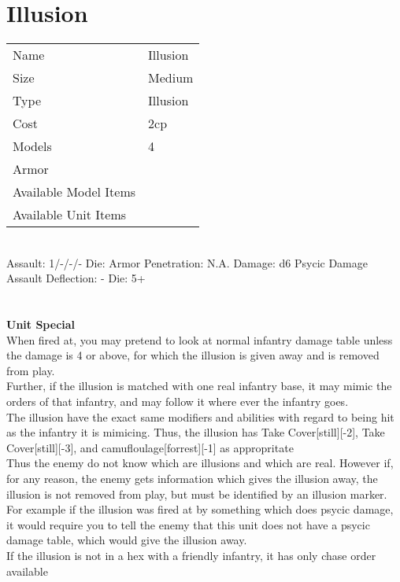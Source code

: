 






\pagebreak

\section{ Illusion }

\begin{tabular}{ll}
  Name & Illusion \\
  Size & Medium\\
  Type & Illusion\\
  Cost & 2cp\\
  Models & 4\\
  Armor & \\
  Available Model Items &  \\
  Available Unit Items &  \\
\end{tabular}

\ \\
Assault: 1/-/-/- Die:  Armor Penetration: N.A. Damage: d6 Psycic Damage \\
Assault Deflection: - Die: 5+\\
\indent  \\
\ \\

{\bf Unit Special} \\
When fired at, you may pretend to look at normal infantry damage table unless the damage is 4 or above, for which the illusion is given away and is removed from play. \\ Further, if the illusion is matched with one real infantry base, it may mimic the orders of that infantry, and may follow it where ever the infantry goes. \\ The illusion have the exact same modifiers and abilities with regard to being hit as the infantry it is mimicing. Thus, the illusion has Take Cover[still][-2], Take Cover[still][-3], and camufloulage[forrest][-1] as appropritate \\ Thus the enemy do not know which are illusions and which are real. However if, for any reason, the enemy gets information which gives the illusion away, the illusion is not removed from play, but must be identified by an illusion marker. For example if the illusion was fired at by something which does psycic damage, it would require you to tell the enemy that this unit does not have a psycic damage table, which would give the illusion away. \\ If the illusion is not in a hex with a friendly infantry, it has only chase order available
\ \\


